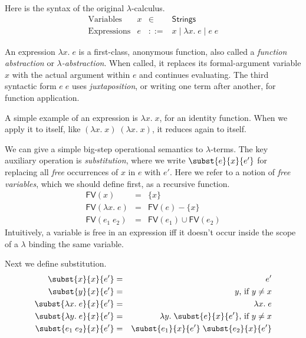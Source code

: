 \documentclass{amsbook}
\theoremstyle{definition}
\theoremstyle{remark}
\numberwithin{section}{chapter}
\numberwithin{equation}{chapter}
\begin{document}
Here is the syntax of the original $\lambda$-calculus.
$$\begin{array}{rrcl}
  \textrm{Variables} & x &\in& \mathsf{Strings} \\
  \textrm{Expressions} & e &::=& x \mid \lambda x. \; e \mid e \; e
\end{array}$$

An expression $\lambda x. \; e$ is a first-class, anonymous function, also called a \emph{function abstraction} or \emph{$\lambda$-abstraction}.
When called, it replaces its formal-argument variable $x$ with the actual argument within $e$ and continues evaluating.
The third syntactic form $e \; e$ uses \emph{juxtaposition}, or writing one term after another, for function application.

A simple example of an expression is $\lambda x. \; x$, for an identity function.
When we apply it to itself, like $(\lambda x. \; x) \; (\lambda x. \; x)$, it reduces again to itself.

\newcommand{\fv}[1]{\textsf{FV}(#1)}

We can give a simple big-step operational semantics to $\lambda$-terms.
The key auxiliary operation is \emph{substitution}, where we write $\subst{e}{x}{e'}$ for replacing all \emph{free} occurrences of $x$ in $e$ with $e'$.
Here we refer to a notion of \emph{free variables}, which we should define first, as a recursive function.
\begin{eqnarray*}
  \fv{x} &=& \{x\} \\
  \fv{\lambda x. \; e} &=& \fv{e} - \{x\} \\
  \fv{e_1 \; e_2} &=& \fv{e_1} \cup \fv{e_2}
\end{eqnarray*}
Intuitively, a variable is free in an expression iff it doesn't occur inside the scope of a $\lambda$ binding the same variable.

Next we define substitution.
\begin{eqnarray*}
  \subst{x}{x}{e'} &=& e' \\
  \subst{y}{x}{e'} &=& y\textrm{, if $y \neq x$} \\
  \subst{\lambda x. \; e}{x}{e'} &=& \lambda x. \; e \\
  \subst{\lambda y. \; e}{x}{e'} &=& \lambda y. \; \subst{e}{x}{e'}\textrm{, if $y \neq x$} \\
  \subst{e_1 \; e_2}{x}{e'} &=& \subst{e_1}{x}{e'} \; \subst{e_2}{x}{e'}
\end{eqnarray*}
\end{document}

